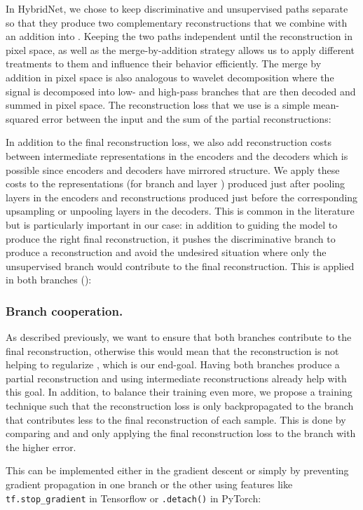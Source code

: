 \documentclass[runningheads]{llncs}
\begin{document}
In HybridNet, we chose to keep discriminative and unsupervised paths separate so that they produce two complementary reconstructions  that we combine with an addition into . Keeping the two paths independent until the reconstruction in pixel space, as well as the merge-by-addition strategy allows us to apply different treatments to them and influence their behavior efficiently. The merge by addition in pixel space is also analogous to wavelet decomposition where the signal is decomposed into low- and high-pass branches that are then decoded and summed in pixel space. The reconstruction loss that we use is a simple mean-squared error between the input and the sum of the partial reconstructions:


In addition to the final reconstruction loss, we also add reconstruction costs between intermediate representations in the encoders and the decoders which is possible since encoders and decoders have mirrored structure. We apply these costs to the representations  (for branch  and layer ) produced just after pooling layers in the encoders and reconstructions  produced just before the corresponding upsampling or unpooling layers in the decoders. This is common in the literature \cite{Zhao2016a,Zhang2016a,Rasmus2015} but is particularly important in our case: in addition to guiding the model to produce the right final reconstruction, it pushes the discriminative branch to produce a reconstruction and avoid the undesired situation where only the unsupervised branch would contribute to the final reconstruction. This is applied in both branches ():



\subsubsection{Branch cooperation.} As described previously, we want to ensure that both branches contribute to the final reconstruction, otherwise this would mean that the reconstruction is not helping to regularize , which is our end-goal. Having both branches produce a partial reconstruction and using intermediate reconstructions already help with this goal. In addition, to balance their training even more, we propose a training technique such that the reconstruction loss is only backpropagated to the branch that contributes less to the final reconstruction of each sample. This is done by comparing  and  and only applying the final reconstruction loss to the branch with the higher error.

This can be implemented either in the gradient descent or simply by preventing gradient propagation in one branch or the other using features like \texttt{tf.stop\_gradient} in Tensorflow or \texttt{.detach()} in PyTorch:
\end{document}
